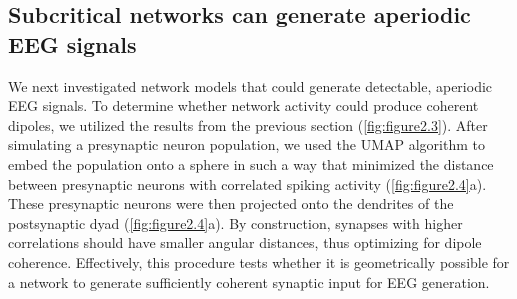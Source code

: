 \subsection{Subcritical networks can generate aperiodic EEG signals}
We next investigated network models that could generate detectable, aperiodic EEG signals. To determine whether network activity could produce coherent dipoles, we utilized the results from the previous section (\autoref{fig:figure2.3}). After simulating a presynaptic neuron population, we used the UMAP algorithm\cite{McInnes2018} to embed the population onto a sphere in such a way that minimized the distance between presynaptic neurons with correlated spiking activity (\autoref{fig:figure2.4}a). These presynaptic neurons were then projected onto the dendrites of the postsynaptic dyad (\autoref{fig:figure2.4}a). By construction, synapses with higher correlations should have smaller angular distances, thus optimizing for dipole coherence. Effectively, this procedure tests whether it is geometrically possible for a network to generate sufficiently coherent synaptic input for EEG generation. 


